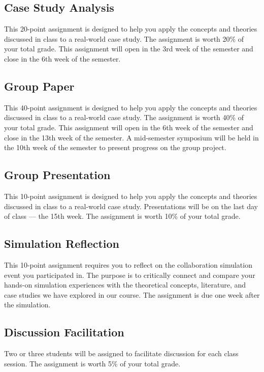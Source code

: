 \documentclass[12pt, letterpaper]{article}
\begin{document}
\subsection*{Case Study Analysis}

This 20-point assignment is designed to help you apply the concepts and theories discussed in class to a real-world case study. The assignment is worth 20\% of your total grade. This assignment will open in the 3rd week of the semester and close in the 6th week of the semester.

\subsection*{Group Paper}

This 40-point assignment is designed to help you apply the concepts and theories discussed in class to a real-world case study. The assignment is worth 40\% of your total grade. This assignment will open in the 6th week of the semester and close in the 13th week of the semester. A mid-semester symposium will be held in the 10th week of the semester to present progress on the group project.

\subsection*{Group Presentation}

This 10-point assignment is designed to help you apply the concepts and theories discussed in class to a real-world case study. Presentations will be on the last day of class --- the 15th week. The assignment is worth 10\% of your total grade.

\subsection*{Simulation Reflection}

This 10-point assignment requires you to reflect on the collaboration simulation event you participated in. The purpose is to critically connect and compare your hands-on simulation experiences with the theoretical concepts, literature, and case studies we have explored in our course. The assignment is due one week after the simulation. 

\subsection*{Discussion Facilitation}

Two or three students will be assigned to facilitate discussion for each class session. The assignment is worth 5\% of your total grade.
\end{document}
